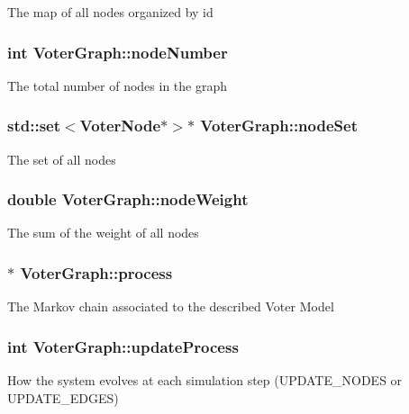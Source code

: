The map of all nodes organized by id \hypertarget{class_voter_graph_a7557cf918e298cf5d5558f7323fe8f35}{
\subsubsection[{node\-Number}]{\setlength{\rightskip}{0pt plus 5cm}int Voter\-Graph\-::node\-Number}}\label{class_voter_graph_a7557cf918e298cf5d5558f7323fe8f35}
The total number of nodes in the graph \hypertarget{class_voter_graph_ab4c1bdbd12ebccd735841471984dfeec}{
\subsubsection[{node\-Set}]{\setlength{\rightskip}{0pt plus 5cm}std\-::set$<${\bf Voter\-Node}$\ast$$>$$\ast$ Voter\-Graph\-::node\-Set}}\label{class_voter_graph_ab4c1bdbd12ebccd735841471984dfeec}
The set of all nodes \hypertarget{class_voter_graph_a8108f0b182d1ca41ef567f7b729fe749}{
\subsubsection[{node\-Weight}]{\setlength{\rightskip}{0pt plus 5cm}double Voter\-Graph\-::node\-Weight}}\label{class_voter_graph_a8108f0b182d1ca41ef567f7b729fe749}
The sum of the weight of all nodes \hypertarget{class_voter_graph_a94b668c67f423d3a4ce25d5605a467cb}{
\subsubsection[{process}]{$\ast$ Voter\-Graph\-::process}}\label{class_voter_graph_a94b668c67f423d3a4ce25d5605a467cb}
The Markov chain associated to the described Voter Model \hypertarget{class_voter_graph_a11db0ef474064d44adb3ea22df8199ee}{
\subsubsection[{update\-Process}]{\setlength{\rightskip}{0pt plus 5cm}int Voter\-Graph\-::update\-Process}}\label{class_voter_graph_a11db0ef474064d44adb3ea22df8199ee}
How the system evolves at each simulation step (U\-P\-D\-A\-T\-E\-\_\-\-N\-O\-D\-E\-S or U\-P\-D\-A\-T\-E\-\_\-\-E\-D\-G\-E\-S) 

